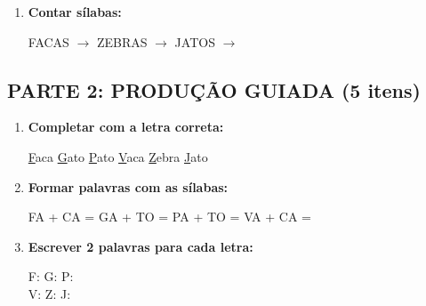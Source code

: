 \begin{exercicio}
\begin{enumerate}
  \item \textbf{Contar sílabas:}
  \begin{center}
  FACAS $\rightarrow$ \underline{\hspace{1cm}} \quad ZEBRAS $\rightarrow$ \underline{\hspace{1cm}} \quad JATOS $\rightarrow$ \underline{\hspace{1cm}}
  \end{center}
\end{enumerate}

\subsection*{PARTE 2: PRODUÇÃO GUIADA (5 itens)}

\begin{enumerate}[resume]
  \item \textbf{Completar com a letra correta:}
  \begin{center}
  \underline{F}aca \quad \underline{G}ato \quad \underline{P}ato \quad \underline{V}aca \quad \underline{Z}ebra \quad \underline{J}ato
  \end{center}

  \item \textbf{Formar palavras com as sílabas:}
  \begin{center}
  FA + CA = \underline{\hspace{2cm}} \quad GA + TO = \underline{\hspace{2cm}} \quad PA + TO = \underline{\hspace{2cm}} \quad VA + CA = \underline{\hspace{2cm}}
  \end{center}

  \item \textbf{Escrever 2 palavras para cada letra:}
  \begin{center}
  F: \underline{\hspace{2cm}} \underline{\hspace{2cm}} \quad G: \underline{\hspace{2cm}} \underline{\hspace{2cm}} \quad P: \underline{\hspace{2cm}} \underline{\hspace{2cm}} \\
  V: \underline{\hspace{2cm}} \underline{\hspace{2cm}} \quad Z: \underline{\hspace{2cm}} \underline{\hspace{2cm}} \quad J: \underline{\hspace{2cm}} \underline{\hspace{2cm}}
  \end{center}


\end{enumerate}
\end{exercicio}
